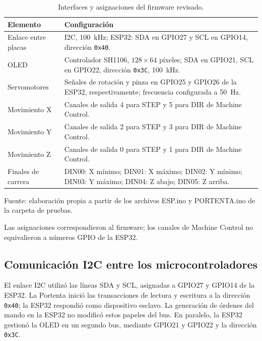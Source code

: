 \begin{table}[H]
    \centering
    \caption{Interfaces y asignaciones del firmware revisado.}
    \label{tab:fase4_interfaces}
    \begin{tabular}{p{}p{}}
        \hline
        Elemento & Configuración \\
        \hline
        Enlace entre placas & I2C, 100~kHz; ESP32: SDA en GPIO27 y SCL en GPIO14, dirección \texttt{0x40}. \\
        OLED & Controlador SH1106, $128\times64$ píxeles; SDA en GPIO21, SCL en GPIO22, dirección \texttt{0x3C}, 100~kHz. \\
        Servomotores & Señales de rotación y pinza en GPIO25 y GPIO26 de la ESP32, respectivamente; frecuencia configurada a 50~Hz. \\
        Movimiento X & Canales de salida 4 para STEP y 5 para DIR de Machine Control. \\
        Movimiento Y & Canales de salida 2 para STEP y 3 para DIR de Machine Control. \\
        Movimiento Z & Canales de salida 0 para STEP y 1 para DIR de Machine Control. \\
        Finales de carrera & DIN00: X mínimo; DIN01: X máximo; DIN02: Y mínimo; DIN03: Y máximo; DIN04: Z abajo; DIN05: Z arriba. \\
        \hline
    \end{tabular}
    \par\small\raggedright Fuente: elaboración propia a partir de los archivos ESP.ino y PORTENTA.ino de la carpeta de pruebas.
    \par\small Las asignaciones correspondieron al firmware; los canales de Machine Control no equivalieron a números GPIO de la ESP32.
\end{table}

\subsection{Comunicación I2C entre los microcontroladores}

El enlace I2C utilizó las líneas SDA y SCL, asignadas a GPIO27 y GPIO14 de la ESP32. La Portenta inició las transacciones de lectura y escritura a la dirección \texttt{0x40}; la ESP32 respondió como dispositivo esclavo. La generación de órdenes del mando en la ESP32 no modificó estos papeles del bus. En paralelo, la ESP32 gestionó la OLED en un segundo bus, mediante GPIO21 y GPIO22 y la dirección \texttt{0x3C}.

